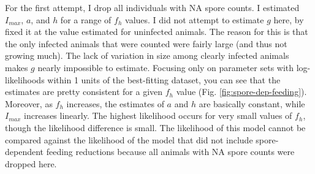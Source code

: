 \documentclass[12pt,reqno,final,pdftex]{amsart}\usepackage[]{graphicx}\usepackage[]{color}
\theoremstyle{plain}
\numberwithin{equation}{part}
\begin{document}
For the first attempt, I drop all individuals with NA spore counts.
I estimated $I_{max}$, $a$, and $h$ for a range of $f_h$ values.
I did not attempt to estimate $g$ here, by fixed it at the value estimated for uninfected animals.
The reason for this is that the only infected animals that were counted were fairly large (and thus not growing much).
The lack of variation in size among clearly infected animals makes $g$ nearly impossible to estimate.
Focusing only on parameter sets with log-likelihoods within 1 units of the best-fitting dataset, you can see that the estimates are pretty consistent for a given $f_h$ value (Fig. \ref{fig:spore-dep-feeding}).
Moreover, as $f_h$ increases, the estimates of $a$ and $h$ are basically constant, while $I_{max}$ increases linearly.
The highest likelihood occurs for very small values of $f_h$, though the likelihood difference is small.
The likelihood of this model cannot be compared against the likelihood of the model that did not include spore-dependent feeding reductions because all animals with NA spore counts were dropped here.
\end{document}

